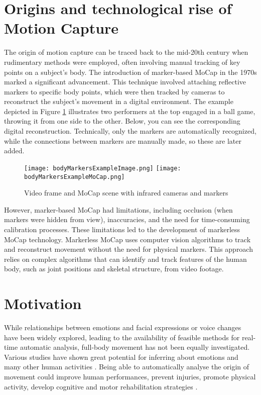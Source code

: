 \section{Origins and technological rise of Motion Capture}
The origin of motion capture can be traced back to the mid-20th century when rudimentary methods were employed, 
often involving manual tracking of key points on a subject's body. 
The introduction of marker-based MoCap in the 1970s marked a significant advancement. 
This technique involved attaching reflective markers to specific body points, which were then tracked by cameras to reconstruct the subject's movement in a digital environment. 
The example depicted in Figure \ref{fig:mocap_scene} illustrates two performers at the top engaged in a ball game, throwing it from one side to the other. Below, you can see the corresponding digital reconstruction. 
Technically, only the markers are automatically recognized, while the connections between markers are manually made, so these are later added.
\begin{figure}[H]
    \centering
    \texttt{[image: bodyMarkersExampleImage.png]}
    \texttt{[image: bodyMarkersExampleMoCap.png]}
    \caption{Video frame and MoCap scene with infrared cameras and markers}
    \label{fig:mocap_scene}
\end{figure}
\vspace{-1.5\baselineskip}
However, marker-based MoCap had limitations, including occlusion 
(when markers were hidden from view), inaccuracies, and the need for time-consuming calibration processes. 
These limitations led to the development of markerless MoCap technology. 
Markerless MoCap uses computer vision algorithms to track and reconstruct movement without the need for physical markers. 
This approach relies on complex algorithms that can identify and track features of the human body, 
such as joint positions and skeletal structure, from video footage.

\section{Motivation}
While relationships between emotions and facial expressions or voice changes have been widely explored, 
leading to the availability of feasible methods for real-time automatic analysis, 
full-body movement has not been equally investigated. 
Various studies have shown great potential for inferring about emotions and many other human activities \cite{Bachmann:2020, preiler:2023}. 
Being able to automatically analyse the origin of movement could improve human performances, 
prevent injuries, promote physical activity, develop cognitive and motor rehabilitation strategies \cite{piana:2016}. 


